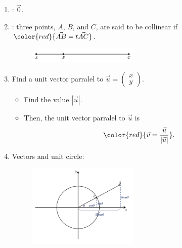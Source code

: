 \documentclass[12pt, a4paper]{article}
\newtheorem{proof}{Proof}[subsection]
\begin{document}
\begin{enumerate}
  $${\color{red}{\vec{a}-\vec{b}=\begin{pmatrix}x-m\\y-n\end{pmatrix}}}.$$
  \begin{proof}
    $$\begin{aligned}
      -\vec{b}&=(-1)\vec{b}=\begin{pmatrix}-m\\-n\end{pmatrix}\\
      \vec{a}-\vec{b}&=\vec{a}+\left(-\vec{b}\right)=\begin{pmatrix}x-m\\y-n\end{pmatrix}.
    \end{aligned}$$
  \end{proof}
  \item \textbf{\color{red}{Zero vector}}: $\vec{0}$.
  \item \textbf{\color{red}{Collinear points}}: three points, $A$, $B$, and $C$, are said to be collinear if ${\color{red}{\vec{AB}=t\vec{AC}}}$.
  \begin{figure}[H]
    \centering
    \includegraphics[width=0.5\textwidth]{Fig.3.5.jpg}
  \end{figure}
  \item Find a unit vector parralel to $\vec{u}=\begin{pmatrix}x\\y\end{pmatrix}.$
  \begin{itemize}
    \item Find the value $\left|\vec{u}\right|.$
    \item Then, the unit vector parralel to $\vec{u}$ is 
    $${\color{red}{\vec{v}=\frac{\vec{u}}{\left|\vec{u}\right|}}}.$$
  \end{itemize}
  \item Vectors and unit circle: 
  \begin{figure}[H]
    \centering
    \includegraphics[width=0.5\textwidth]{Fig.3.6.jpg}

\end{figure}
\end{enumerate}
\end{document}
